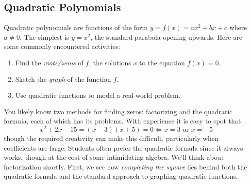 \clearpage



\subsection{Quadratic Polynomials}

Quadratic polynomials are functions of the form $y=f(x)=ax^2+bx+c$ where $a\neq 0$. The simplest is $y=x^2$, the standard parabola opening upwards. Here are some commonly encountered activities:
\begin{enumerate}\itemsep0pt
  \item Find the \emph{roots/zeros} of $f$, the solutions $x$ to the equation $f(x)=0$.
  \item Sketch the \emph{graph} of the function $f$.
  \item Use quadratic functions to model a real-world problem.
\end{enumerate}

You likely know two methods for finding zeros: factorizing and the quadratic formula, each of which has its problems. With experience it is easy to spot that 
\[
	x^2+2x-15=(x-3)(x+5)=0\iff x=3\text{ or }x=-5
\]
though the required creativity can make this difficult, particularly when coefficients are large. Students often prefer the quadratic formula since it always works, though at the cost of some intimidating algebra. We'll think about factorization shortly. First, we see how \emph{completing the square} lies behind both the quadratic formula and the standard approach to graphing quadratic functions.

